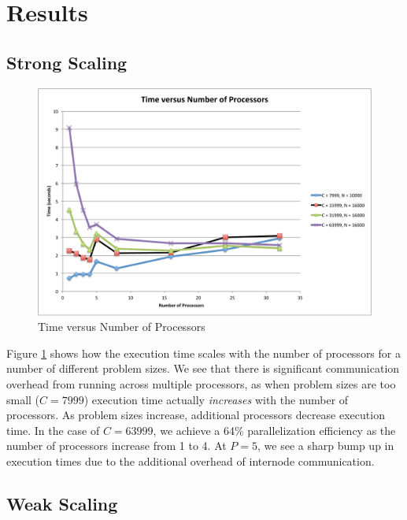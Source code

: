 \documentclass[11pt]{article} %
\begin{document}
\section{Results}

\subsection{Strong Scaling}

\begin{figure}
\begin{centering}
\includegraphics[width=0.5\paperwidth]{figures/TvsP.pdf}
\caption{Time versus Number of Processors}
\label{TvsP}
\end{centering}
\end{figure}

Figure \ref{TvsP} shows how the execution time scales with the number of processors for a number of different problem sizes. We see that there is significant communication overhead from running across multiple processors, as when problem sizes are too small ($C = 7999$) execution time actually \emph{increases} with the number of processors. As problem sizes increase, additional processors decrease execution time. In the case of $C = 63999$, we achieve a 64\% parallelization efficiency as the number of processors increase from 1 to 4. At $P = 5$, we see a sharp bump up in execution times due to the additional overhead of internode communication.

\subsection{Weak Scaling}
\end{document}
